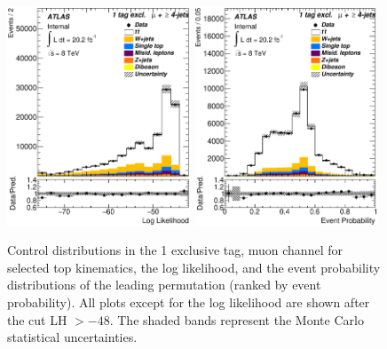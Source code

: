 \begin{figure}[!h]
\begin{center}
		\includegraphics[height=65mm]{chapters/whel/figures/control_Plots2/bTag_1excl_NoLHCut/LogLikelihood_mu}
        \includegraphics[height=65mm]{chapters/whel/figures/control_Plots2/bTag_1excl/EventProbability_mu}
	\caption{Control distributions in the 1 exclusive \bt tag, muon channel for selected top kinematics, the log likelihood, and the event probability distributions of the leading permutation (ranked by event probability). All plots except for the log likelihood are shown after the cut LH $> -48$. The shaded bands represent the Monte Carlo statistical uncertainties.}
	\label{fig:klfitter_control_plots_3}
	\end{center}    
	\end{figure}    
	
